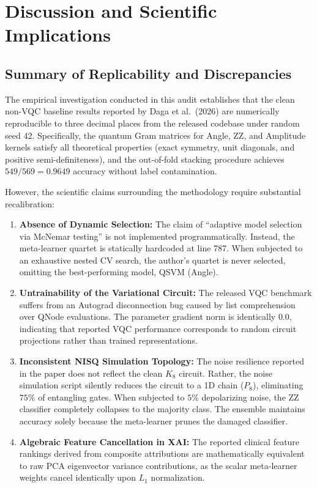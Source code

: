\section{Discussion and Scientific Implications}
\label{sec:discussion-synthesis}

\subsection{Summary of Replicability and Discrepancies}
The empirical investigation conducted in this audit establishes that the clean non-VQC baseline results reported by Daga et al.\ (2026) are numerically reproducible to three decimal places from the released codebase under random seed 42. Specifically, the quantum Gram matrices for Angle, ZZ, and Amplitude kernels satisfy all theoretical properties (exact symmetry, unit diagonals, and positive semi-definiteness), and the out-of-fold stacking procedure achieves $549/569 = 0.9649$ accuracy without label contamination.

However, the scientific claims surrounding the methodology require substantial recalibration:
\begin{enumerate}[leftmargin=*]
  \item \textbf{Absence of Dynamic Selection:} The claim of ``adaptive model selection via McNemar testing'' is not implemented programmatically. Instead, the meta-learner quartet is statically hardcoded at line 787. When subjected to an exhaustive nested CV search, the author's quartet is never selected, omitting the best-performing model, QSVM (Angle).
  \item \textbf{Untrainability of the Variational Circuit:} The released VQC benchmark suffers from an Autograd disconnection bug caused by list comprehension over QNode evaluations. The parameter gradient norm is identically $0.0$, indicating that reported VQC performance corresponds to random circuit projections rather than trained representations.
  \item \textbf{Inconsistent NISQ Simulation Topology:} The noise resilience reported in the paper does not reflect the clean $K_8$ circuit. Rather, the noise simulation script silently reduces the circuit to a 1D chain ($P_8$), eliminating $75\%$ of entangling gates. When subjected to $5\%$ depolarizing noise, the ZZ classifier completely collapses to the majority class. The ensemble maintains accuracy solely because the meta-learner prunes the damaged classifier.
  \item \textbf{Algebraic Feature Cancellation in XAI:} The reported clinical feature rankings derived from composite attributions are mathematically equivalent to raw PCA eigenvector variance contributions, as the scalar meta-learner weights cancel identically upon $L_1$ normalization.
\end{enumerate}

